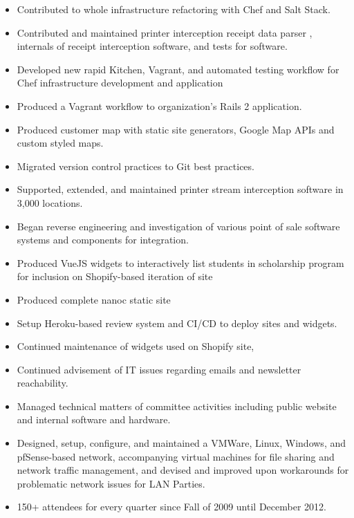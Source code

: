 \documentclass[10pt,letter,ragged2e]{altacv}
\begin{document}
\begin{paracol}{2}
\begin{itemize}
\item Contributed to whole infrastructure refactoring with Chef and Salt Stack.
\item Contributed and maintained printer interception receipt data parser , internals of receipt interception software, and tests for software.
\item Developed new rapid Kitchen, Vagrant, and automated testing workflow for Chef infrastructure development and application
\item Produced a Vagrant workflow to organization's Rails 2 application.
\item Produced customer map with static site generators, Google Map APIs and custom styled maps. 
\item Migrated version control practices to Git best practices.
\item Supported, extended, and maintained printer stream interception software in 3,000 locations.
\item Began reverse engineering and investigation of various point of sale software systems and components for integration.
\end{itemize}

\begin{itemize}
\item Produced VueJS widgets to interactively list students in scholarship program for inclusion on Shopify-based iteration of site
\item Produced complete nanoc static site
\item Setup Heroku-based review system and CI/CD to deploy sites and widgets.
\item Continued maintenance of widgets used on Shopify site,
\item Continued advisement of IT issues regarding emails and newsletter reachability.
\end{itemize}

\begin{itemize}

\item Managed technical matters of committee activities including public website and internal software and hardware.
\item Designed, setup, configure, and maintained a VMWare, Linux, Windows, and pfSense-based network, accompanying virtual machines for file sharing and network traffic management, and devised and improved upon workarounds for problematic network issues for LAN Parties.
\item 150+ attendees for every quarter since Fall of 2009 until December 2012.
\end{itemize}



\end{paracol}
\end{document}
